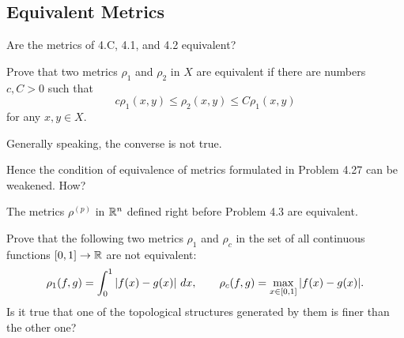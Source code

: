 \subsection{Equivalent Metrics}

\begin{minorEx}
    Are the metrics of 4.C, 4.1, and 4.2 equivalent?
\end{minorEx}

\begin{minorEx}
    Prove that two metrics $\rho_1$ and $\rho_2$ in $X$ are equivalent if there
    are numbers $c, C > 0$ such that
    \[
        c \rho_1(x,y) \leq \rho_2(x,y) \leq C \rho_1(x,y)
    \]
    for any $x, y \in X$.
\end{minorEx}

\begin{minorEx}
    Generally speaking, the converse is not true.
\end{minorEx}

\begin{minorEx}
    [Riddle]
    Hence the condition of equivalence of metrics formulated in Problem 4.27 can
    be weakened. How?
\end{minorEx}

\begin{minorEx}
    The metrics $\rho^{(p)}$ in $\mathbb{R}^n$ defined right before Problem 4.3 are
    equivalent.
\end{minorEx}

\begin{minorEx}
    Prove that the following two metrics $\rho_1$ and $\rho_c$ in the set of all
    continuous functions $[0,1] \to \mathbb{R}$ are not equivalent:
    \[
        \rho_1(f,g) = \int_{0}^{1} \abs{f(x) - g(x)} \ dx, \qquad
        \rho_c(f,g) = \max_{x \in [0,1]} \abs{f(x) - g(x)}.
    \]
    Is it true that one of the topological structures generated by them is finer
    than the other one?
\end{minorEx}
